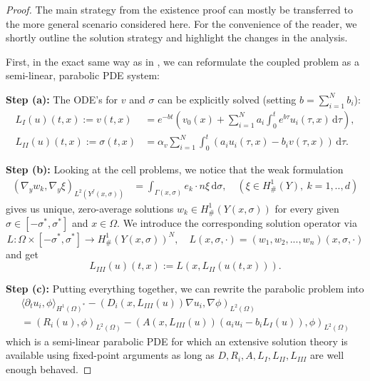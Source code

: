 \documentclass[reqno, 11pt]{amsart}
\numberwithin{equation}{section}
\newcommand{\di}[1]{\,\mathrm{d}#1}
\begin{document}
\begin{proof}
The main strategy from the existence proof \cite[Theorem 13]{EdenNikolopoulosMuntean22} can mostly be transferred to the more general scenario considered here.
For the convenience of the reader, we shortly outline the solution strategy and highlight the changes in the analysis.

First, in the exact same way as in \cite{EdenNikolopoulosMuntean22}, we can reformulate the coupled problem as a semi-linear, parabolic PDE system:

\textbf{Step (a):} The ODE's for $v$ and $\sigma$ can be explicitly solved (setting $b = \sum_{i=1}^N  b_i$):
%
\begin{align}
L_{I}(u)(t,x):=v(t, x) &= e^{-bt} \left( v_0(x) + \sum_{i=1}^N a_i \int_0^t e^{b\tau} u_i(\tau, x)\di{\tau} \right),\\
L_{II}(u)(t,x):=\sigma(t, x) &=\alpha_v \sum_{i=1}^N \int_0^t \left( a_i u_i(\tau, x) -  b_i v(\tau, x) \right) \di{\tau}.
\end{align}

\textbf{Step (b):} Looking at the cell problems, we notice that the weak formulation 
\begin{align*}
(\nabla_y w_k,\nabla_y\xi)_{L^2(Y^f(x,\sigma))}&=\int_{\Gamma(x,\sigma)}e_k\cdot n\xi\di{\sigma},\quad (\xi\in H^1_\#(Y),\ k=1,..,d)
\end{align*}
gives us unique, zero-average solutions $w_k\in H_\#^1(Y(x,\sigma))$ for every given $\sigma\in[-\sigma^*,\sigma^*]$ and $x\in\Omega$.
We introduce the corresponding solution operator via
\[
L\colon\Omega\times[-\sigma^*,\sigma^*]\to H_\#^1(Y(x,\sigma))^N,\quad L(x,\sigma,\cdot)=(w_{1},w_{2},...,w_{n})(x,\sigma,\cdot)
\]
%
and get
%
\[
L_{III}(u)(t,x):=L(x,L_{II}(u(t,x))).
\]

\vspace{1em}
\textbf{Step (c):} Putting everything together, we can rewrite the parabolic problem into
%
\begin{multline*}
\langle\partial_t u_i,\phi\rangle_{H^1(\Omega)^*}-(D_i(x,L_{III}(u))\nabla u_i,\nabla\phi)_{L^2(\Omega)}\\ =(R_i(u),\phi)_{L^2(\Omega)}-(A(x,L_{III}(u))(a_iu_i- b_iL_{I}(u)),\phi)_{L^2(\Omega)}
\end{multline*}
%
which is a semi-linear parabolic PDE for which an extensive solution theory is available using fixed-point arguments as long as $D, R_i, A, L_{I},L_{II},L_{III}$ are well enough behaved.


\end{proof}
\end{document}
